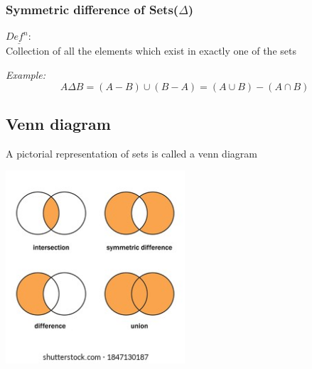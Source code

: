 \documentclass[11pt,letterpaper]{article}
\newenvironment{example}                             
        {\noindent\textit{Example:}\\}
	{}
\newenvironment{definition}
	{\begin{mdframed}$\underline{\textit{Def}^\textit{n}:} $\\}
	{\end{mdframed}}
\begin{document}
\subsubsection{Symmetric difference of Sets($\Delta$)}
\begin{definition}
  Collection of all the elements which exist in exactly one of the sets
\end{definition}
\begin{example}
  \[
    A\Delta B= (A-B) \cup (B-A) = (A\cup B) - (A\cap B)
  \]
\end{example}

\subsection{Venn diagram}
A pictorial representation of sets is called a venn diagram\\
\begin{center}
  \includegraphics[width=0.5\textwidth]{figs/venn diagram.png}
\end{center}
\end{document}
